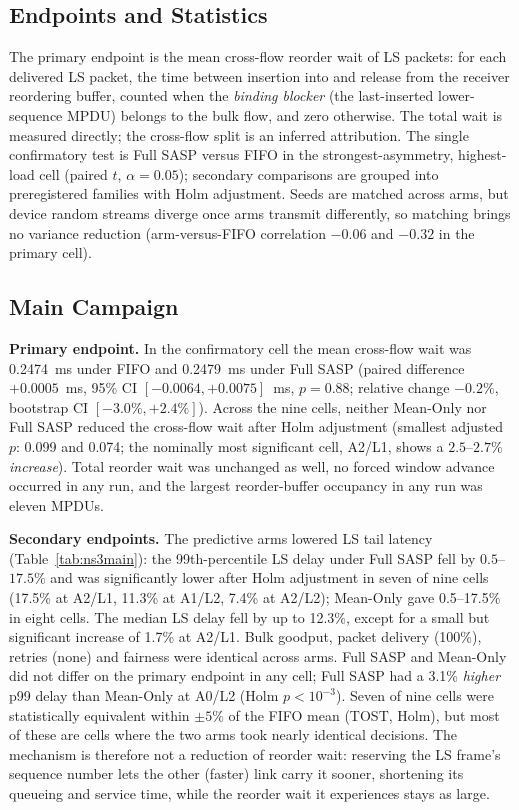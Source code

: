 \documentclass[10pt,journal,compsoc]{IEEEtran}
\begin{document}
\subsection{Endpoints and Statistics}
The primary endpoint is the mean cross-flow reorder wait of LS packets: for each delivered LS packet, the time between insertion into and release from the receiver reordering buffer, counted when the \emph{binding blocker} (the last-inserted lower-sequence MPDU) belongs to the bulk flow, and zero otherwise. The total wait is measured directly; the cross-flow split is an inferred attribution. The single confirmatory test is Full SASP versus FIFO in the strongest-asymmetry, highest-load cell (paired $t$, $\alpha=0.05$); secondary comparisons are grouped into preregistered families with Holm adjustment. Seeds are matched across arms, but device random streams diverge once arms transmit differently, so matching brings no variance reduction (arm-versus-FIFO correlation $-0.06$ and $-0.32$ in the primary cell).



\subsection{Main Campaign}
\textbf{Primary endpoint.} In the confirmatory cell the mean cross-flow wait was 0.2474~ms under FIFO and 0.2479~ms under Full SASP (paired difference $+0.0005$~ms, 95\% CI $[-0.0064, +0.0075]$~ms, $p=0.88$; relative change $-0.2\%$, bootstrap CI $[-3.0\%, +2.4\%]$). Across the nine cells, neither Mean-Only nor Full SASP reduced the cross-flow wait after Holm adjustment (smallest adjusted $p$: 0.099 and 0.074; the nominally most significant cell, A2/L1, shows a $2.5$--$2.7\%$ \emph{increase}). Total reorder wait was unchanged as well, no forced window advance occurred in any run, and the largest reorder-buffer occupancy in any run was eleven MPDUs.

\textbf{Secondary endpoints.} The predictive arms lowered LS tail latency (Table~\ref{tab:ns3main}): the 99th-percentile LS delay under Full SASP fell by $0.5$--$17.5\%$ and was significantly lower after Holm adjustment in seven of nine cells (17.5\% at A2/L1, 11.3\% at A1/L2, 7.4\% at A2/L2); Mean-Only gave 0.5--17.5\% in eight cells. The median LS delay fell by up to 12.3\%, except for a small but significant increase of 1.7\% at A2/L1. Bulk goodput, packet delivery (100\%), retries (none) and fairness were identical across arms. Full SASP and Mean-Only did not differ on the primary endpoint in any cell; Full SASP had a 3.1\% \emph{higher} p99 delay than Mean-Only at A0/L2 (Holm $p<10^{-3}$). Seven of nine cells were statistically equivalent within $\pm5\%$ of the FIFO mean (TOST, Holm), but most of these are cells where the two arms took nearly identical decisions. The mechanism is therefore not a reduction of reorder wait: reserving the LS frame's sequence number lets the other (faster) link carry it sooner, shortening its queueing and service time, while the reorder wait it experiences stays as large.
\end{document}
